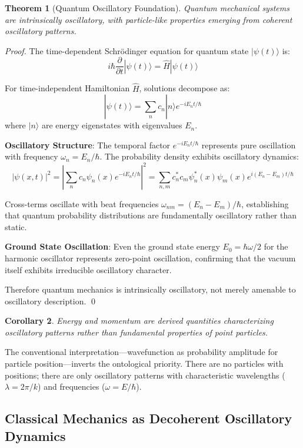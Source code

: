 \documentclass[11pt]{article}
\newtheorem{theorem}{Theorem}[section]
\newtheorem{corollary}[theorem]{Corollary}
\theoremstyle{remark}
\begin{document}
\begin{theorem}[Quantum Oscillatory Foundation]
\label{thm:quantum_oscillatory}
Quantum mechanical systems are intrinsically oscillatory, with particle-like properties emerging from coherent oscillatory patterns.
\end{theorem}

\begin{proof}
The time-dependent Schrödinger equation for quantum state $|\psi(t)\rangle$ is:
$$i\hbar \frac{\partial}{\partial t}|\psi(t)\rangle = \hat{H}|\psi(t)\rangle$$

For time-independent Hamiltonian $\hat{H}$, solutions decompose as:
$$|\psi(t)\rangle = \sum_n c_n |n\rangle e^{-iE_n t/\hbar}$$
where $|n\rangle$ are energy eigenstates with eigenvalues $E_n$.

\textbf{Oscillatory Structure}: The temporal factor $e^{-iE_n t/\hbar}$ represents pure oscillation with frequency $\omega_n = E_n/\hbar$. The probability density exhibits oscillatory dynamics:
$$|\psi(x,t)|^2 = \left|\sum_n c_n \psi_n(x) e^{-iE_n t/\hbar}\right|^2 = \sum_{n,m} c_n^* c_m \psi_n^*(x) \psi_m(x) e^{i(E_n - E_m)t/\hbar}$$

Cross-terms oscillate with beat frequencies $\omega_{nm} = (E_n - E_m)/\hbar$, establishing that quantum probability distributions are fundamentally oscillatory rather than static.

\textbf{Ground State Oscillation}: Even the ground state energy $E_0 = \hbar\omega/2$ for the harmonic oscillator represents zero-point oscillation, confirming that the vacuum itself exhibits irreducible oscillatory character.

Therefore quantum mechanics is intrinsically oscillatory, not merely amenable to oscillatory description. \qed
\end{proof}

\begin{corollary}
Energy and momentum are derived quantities characterizing oscillatory patterns rather than fundamental properties of point particles.
\end{corollary}

The conventional interpretation—wavefunction as probability amplitude for particle position—inverts the ontological priority. There are no particles with positions; there are only oscillatory patterns with characteristic wavelengths ($\lambda = 2\pi/k$) and frequencies ($\omega = E/\hbar$).

\subsection{Classical Mechanics as Decoherent Oscillatory Dynamics}
\end{document}
